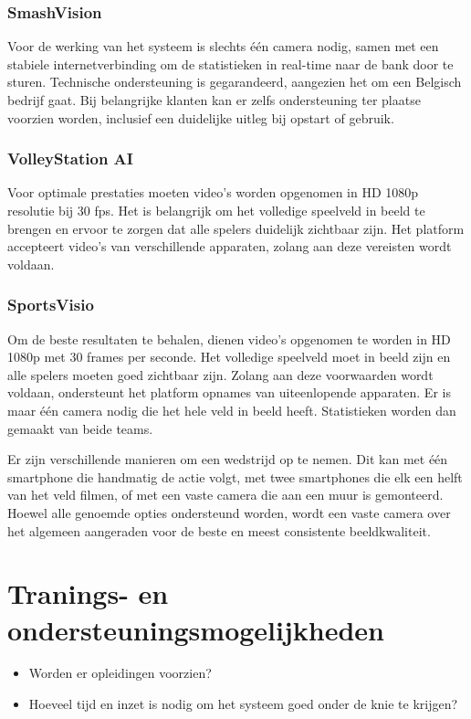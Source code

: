\subsubsection{SmashVision}
Voor de werking van het systeem is slechts één camera nodig, samen met een stabiele internetverbinding om de statistieken in real-time naar de bank door te sturen. Technische ondersteuning is gegarandeerd, aangezien het om een Belgisch bedrijf gaat. Bij belangrijke klanten kan er zelfs ondersteuning ter plaatse voorzien worden, inclusief een duidelijke uitleg bij opstart of gebruik.
\subsubsection{VolleyStation AI}
Voor optimale prestaties moeten video's worden opgenomen in HD 1080p resolutie bij 30 fps. Het is belangrijk om het volledige speelveld in beeld te brengen en ervoor te zorgen dat alle spelers duidelijk zichtbaar zijn. Het platform accepteert video's van verschillende apparaten, zolang aan deze vereisten wordt voldaan. 
\subsubsection{SportsVisio}
Om de beste resultaten te behalen, dienen video's opgenomen te worden in HD 1080p met 30 frames per seconde. Het volledige speelveld moet in beeld zijn en alle spelers moeten goed zichtbaar zijn. Zolang aan deze voorwaarden wordt voldaan, ondersteunt het platform opnames van uiteenlopende apparaten. Er is maar één camera nodig die het hele veld in beeld heeft. Statistieken worden dan gemaakt van beide teams.

Er zijn verschillende manieren om een wedstrijd op te nemen. Dit kan met één smartphone die handmatig de actie volgt, met twee smartphones die elk een helft van het veld filmen, of met een vaste camera die aan een muur is gemonteerd. Hoewel alle genoemde opties ondersteund worden, wordt een vaste camera over het algemeen aangeraden voor de beste en meest consistente beeldkwaliteit.

\section{Tranings- en ondersteuningsmogelijkheden}
\begin{itemize}
  \item Worden er opleidingen voorzien?
  \item Hoeveel tijd en inzet is nodig om het systeem goed onder de knie te krijgen?
\end{itemize}
